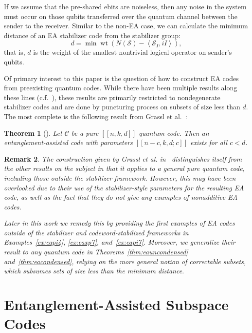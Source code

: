 \documentclass[]{amsart}
\DeclareMathOperator{\wt}{wt}
\newtheorem{theorem}{Theorem}
\newtheorem{remark}[theorem]{Remark}
\begin{document}
If we assume that the pre-shared ebits are noiseless, then any noise in the system must occur on those qubits transferred over the quantum channel between the sender to the receiver. Similar to the non-EA case, we can calculate the minimum distance of an EA stabilizer code from the stabilizer group:
\begin{equation}
    d=\min\wt\!\left(N\!\left(\mathcal{S}\right)-\left\langle \mathcal{S}_I,iI\right\rangle\right),
\end{equation}
that is, $d$ is the weight of the smallest nontrivial logical operator on sender's qubits.

Of primary interest to this paper is the question of how to construct EA codes from preexisting quantum codes.
While there have been multiple results along these lines (c.f.~\cite{LB2012,GHMR2019,GHMR2021,GHW2022,UM2022}), these results are primarily restricted to nondegenerate stabilizer codes and are done by puncturing process on subsets of size less than $d$.
The most complete is the following result from Grassl et al.~\cite{GHW2022}:
\begin{theorem}[{\cite[Theorem 10]{GHW2022}}]
    Let $\mathcal{C}$ be a pure $\left[\!\left[n,k,d\right]\!\right]$ quantum code. Then an entanglement-assisted code with parameters $\left[\!\left[n-c,k,d;c\right]\!\right]$ exists for all $c<d$.
\end{theorem}

\begin{remark}\label{thm:remarkGHW}
    The construction given by Grassl et al. in~\cite[Theorem 10]{GHW2022} distinguishes itself from the other results on the subject in that it applies to a general pure quantum code, including those outside the stabilizer framework.
    However, this may have been overlooked due to their use of the stabilizer-style parameters for the resulting EA code, as well as the fact that they do not give any examples of nonadditive EA codes.

    Later in this work we remedy this by providing the first examples of EA codes outside of the stabilizer and codeword-stabilized frameworks in Examples~\ref{ex:eapi4}, \ref{ex:eaxp7}, and~\ref{ex:eapi7}.
    Moreover, we generalize their result to any quantum code in Theorems~\ref{thm:eauncondensed} and~\ref{thm:eacondensed}, relying on the more general notion of correctable subsets, which subsumes sets of size less than the minimum distance.
\end{remark}

\section{Entanglement-Assisted Subspace Codes}
\end{document}
